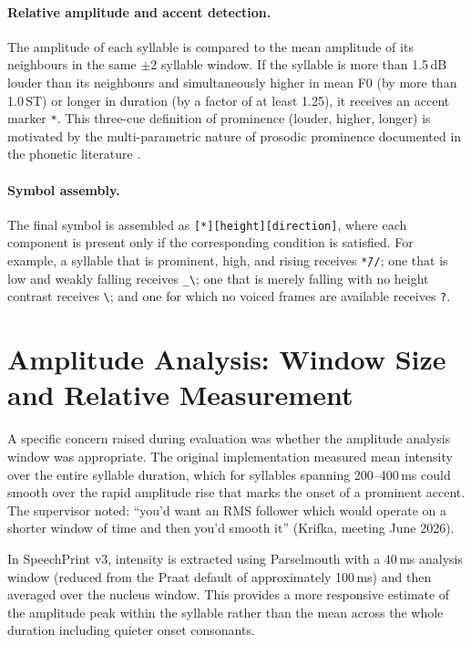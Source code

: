 \paragraph{Relative amplitude and accent detection.}
The amplitude of each syllable is compared to the mean amplitude of its
neighbours in the same $\pm 2$ syllable window. If the syllable is more than
1.5\,dB louder than its neighbours and simultaneously higher in mean F0 (by more
than 1.0\,ST) or longer in duration (by a factor of at least 1.25), it receives
an accent marker \texttt{*}. This three-cue definition of prominence (louder,
higher, longer) is motivated by the multi-parametric nature of prosodic
prominence documented in the phonetic literature \cite{ladd2008intonational}.

\paragraph{Symbol assembly.}
The final symbol is assembled as \texttt{[*][height][direction]}, where each
component is present only if the corresponding condition is satisfied. For
example, a syllable that is prominent, high, and rising receives
\texttt{*{\={}}//}; one that is low and weakly falling receives
\texttt{\_\textbackslash}; one that is merely falling with no height contrast
receives \texttt{\textbackslash}; and one for which no voiced frames are
available receives \texttt{?}.

\section{Amplitude Analysis: Window Size and Relative Measurement}
\label{sec:amplitude}

A specific concern raised during evaluation was whether the amplitude analysis
window was appropriate. The original implementation measured mean intensity over
the entire syllable duration, which for syllables spanning 200--400\,ms could
smooth over the rapid amplitude rise that marks the onset of a prominent accent.
The supervisor noted: ``you'd want an RMS follower which would operate on a
shorter window of time and then you'd smooth it'' (Krifka, meeting June 2026).

In SpeechPrint v3, intensity is extracted using Parselmouth with a 40\,ms
analysis window (reduced from the Praat default of approximately 100\,ms) and
then averaged over the nucleus window. This provides a more responsive estimate
of the amplitude peak within the syllable rather than the mean across the whole
duration including quieter onset consonants.

